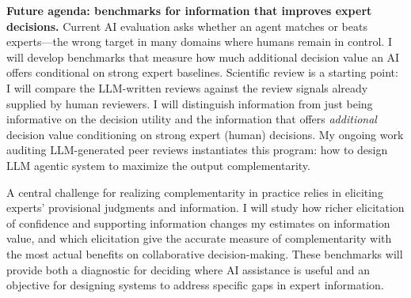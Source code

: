 \textbf{Future agenda: benchmarks for information that improves expert decisions.}
Current AI evaluation asks whether an agent matches or beats experts---the wrong target in many domains where humans remain in control. 
I will develop benchmarks that measure how much additional decision value an AI offers conditional on strong expert baselines.
Scientific review is a starting point: I will compare the LLM-written reviews against the review signals already supplied by human reviewers.
I will distinguish information from just being informative on the decision utility and the information that offers \emph{additional} decision value conditioning on strong expert (human) decisions.
My ongoing work auditing LLM-generated peer reviews instantiates this program: how to design LLM agentic system to maximize the output complementarity.

A central challenge for realizing complementarity in practice relies in eliciting experts' provisional judgments and information.
I will study how richer elicitation of confidence and supporting information changes my estimates on information value, and which elicitation give the accurate measure of complementarity with the most actual benefits on collaborative decision-making.
These benchmarks will provide both a diagnostic for deciding where AI assistance is useful and an objective for designing systems to address specific gaps in expert information.

